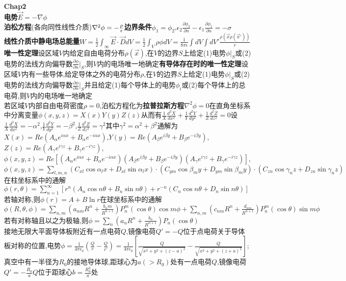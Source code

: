 \documentclass[10pt,a4paper]{article}
\begin{document}
\begin{multicols}{2}
\noindent\textbf{Chap2}\\
\textbf{电势}$\vec{E}=-\nabla\phi$\\
\textbf{泊松方程}(各向同性线性介质)$\nabla^2\phi=-\frac{\rho}{\epsilon}\\
$\textbf{边界条件}$\phi_1=\phi_2$,$\epsilon_2\frac{\partial\phi_2}{\partial n}-\epsilon_1\frac{\partial\phi_1}{\partial n}=-\sigma$\\
\textbf{线性介质中静电场总能量}$W=\frac{1}{2}\int_{\infty}\vec{E}\cdot\vec{D}dV=\frac{1}{2}\int_V\rho\phi dV=\frac{1}{8\pi\epsilon}\int dV\int dV'\frac{\rho(\vec{x}\rho(\vec{x}'))}{r}$\\
\textbf{唯一性定理}设区域$V$内给定自由电荷分布$\rho(\vec{x})$,在$V$的边界$S$上给定(1)电势$\phi|_{S}$或(2)电势的法线方向偏导数$\frac{\partial\phi}{\partial n}|_S$,则$V$内的电场唯一地确定\textbf{有导体存在时的唯一性定理}设区域$V$内有一些导体,给定导体之外的电荷分布$\rho$,在$V$的边界$S$上给定(1)电势$\phi|_{S}$或(2)电势的法线方向偏导数$\frac{\partial\phi}{\partial n}|_S$并且给定(1)每个导体上的电势$\phi_i$或(2)每个导体上的总电荷,则$V$内的电场唯一地确定\\
若区域$V$内部自由电荷密度$\rho=0$,泊松方程化为\textbf{拉普拉斯方程}$\nabla^2\phi=0$在直角坐标系中分离变量$\phi(x,y,z)=X(x)Y(y)Z(z)$从而有$\frac{1}{X}\frac{d^2X}{dx^2}+\frac{1}{Y}\frac{d^2Y}{dy^2}+\frac{1}{Z}\frac{d^2Z}{dz^2}=0$设$\frac{1}{X}\frac{d^2X}{dx^2}=-\alpha^2$,$\frac{1}{Y}\frac{d^2Y}{dy^2}=-\beta^2$,$\frac{1}{Z}\frac{d^2Z}{dz^2}=\gamma^2$其中$\gamma^2=\alpha^2+\beta^2$通解为$X(x)=Re(A_{\alpha}e^{i\alpha x}+B_{\alpha}e^{-i\alpha x})$,$Y(y)=Re(A_{\beta}e^{i\beta y}+B_{\beta}e^{-i\beta y})$,$Z(z)=Re(A_{\gamma}e^{i\gamma z}+B_{\gamma}e^{-i\gamma z})$,$\phi(x,y,z)=Re[(A_{\alpha}e^{i\alpha x}+B_{\alpha}e^{-i\alpha x})(A_{\beta}e^{i\beta y}+B_{\beta}e^{-i\beta y})(A_{\gamma}e^{i\gamma z}+B_{\gamma}e^{-i\gamma z})]$,$\phi(x,y,z)=\sum_{l,m,n}(C_{xl}\cos\alpha_lx+D_{xl}\sin\alpha_lx)\cdot(C_{ym}\cos\beta_my+D_{ym}\sin\beta_my)\cdot(C_{zn}\cos\gamma_nz+D_{zn}\sin\gamma_nz)$在柱坐标系中的通解$\phi(r,\theta)=\sum_{n=1}^{\infty}[r^n(A_n\cos n\theta+B_n\sin n\theta)+r^{-n}(C_n\cos n\theta+D_n\sin n\theta)]$若轴对称,则$\phi(r)=A+B\ln r$在球坐标系中的通解$\phi(R,\theta,\phi)=\sum_{n,m}(a_{nm}R^n+\frac{b_nm}{R^{n+1}})P_n^m(\cos\theta)\cos m\phi+\sum_{n,m}(c_{nm}R^n+\frac{d_{nm}}{R^{n+1}})P_n^m(\cos\theta)\sin m\phi$若有对称轴且以之为极轴,则$\phi=\sum_n(a_nR^n+\frac{b_n}{R^{n+1}})P_n(\cos\theta)$\\
接地无限大平面导体板附近有一点电荷$Q$,镜像电荷$Q'=-Q$位于点电荷关于导体板对称的位置,电势$\phi=\frac{1}{4\pi\epsilon_0}(\frac{Q}{r}-\frac{Q}{r'})=\frac{1}{4\pi\epsilon_0}[\frac{Q}{\sqrt{x^2+y^2+(z-a)^2}}-\frac{Q}{\sqrt{x^2+y^2+(z+a)^2}}]$;真空中有一半径为$R_0$的接地导体球,距球心为$a(>R_0)$处有一点电荷$Q$,镜像电荷$Q'=-\frac{R_0}{a}Q$位于距球心$b=\frac{R_0^2}{a}$处\\

\end{multicols}
\end{document}
